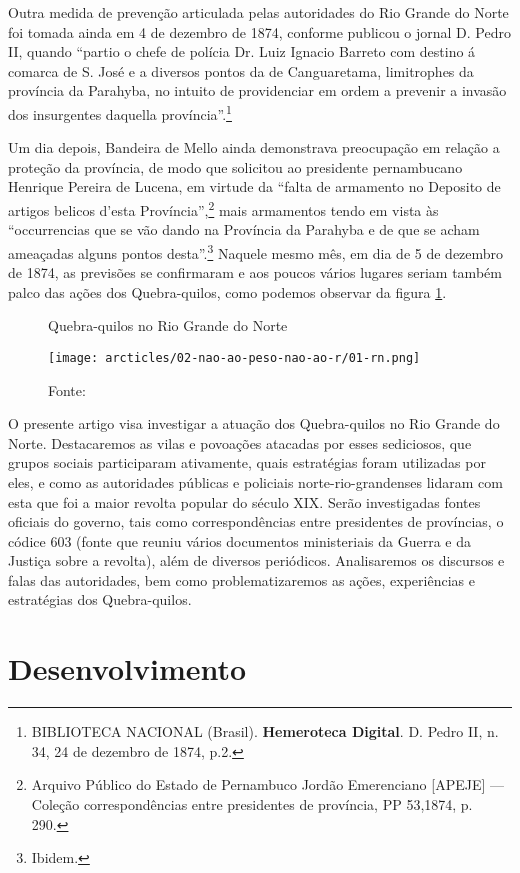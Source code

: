 \begin{refsection}
Outra medida de prevenção articulada pelas autoridades do Rio Grande do Norte foi tomada ainda em 4 de dezembro de 1874, conforme publicou o jornal D. Pedro II, quando “partio o chefe de polícia Dr. Luiz Ignacio Barreto com destino á comarca de S. José e a diversos pontos da de Canguaretama, limitrophes da província da Parahyba, no intuito de providenciar em ordem a prevenir a invasão dos insurgentes daquella província”.\footnote{BIBLIOTECA NACIONAL (Brasil). \textbf{Hemeroteca Digital}. D. Pedro II, n. 34, 24 de dezembro de 1874, p.2. }

Um dia depois, Bandeira de Mello ainda demonstrava preocupação em relação a proteção da província, de modo que solicitou ao presidente pernambucano Henrique Pereira de Lucena, em virtude da “falta de armamento no Deposito de artigos belicos d’esta Província”,\footnote{Arquivo Público do Estado de Pernambuco Jordão Emerenciano [APEJE] --- Coleção correspondências entre presidentes de província, PP 53,1874, p. 290.} mais armamentos tendo em vista às “occurrencias que se vão dando na Província da Parahyba e de que se acham ameaçadas alguns pontos desta”.\footnote{Ibidem.} Naquele mesmo mês, em dia de 5 de dezembro de 1874, as previsões se confirmaram e aos poucos vários lugares seriam também palco das ações dos Quebra-quilos, como podemos observar da figura \ref{fig:quebra-quilo-rn}. 

\begin{figure}[ht]%
    \centering%
    \caption{Quebra-quilos no Rio Grande do Norte}%
    \texttt{[image: arcticles/02-nao-ao-peso-nao-ao-r/01-rn.png]}%
    \caption*{Fonte: \textcite[p.~17]{Monteiro1993}}%
    \label{fig:quebra-quilo-rn}%
\end{figure}%

O presente artigo visa investigar a atuação dos Quebra-quilos no Rio Grande do Norte. Destacaremos as vilas e povoações atacadas por esses sediciosos, que grupos sociais participaram ativamente, quais estratégias foram utilizadas por eles, e como as autoridades públicas e policiais norte-rio-grandenses lidaram com esta que foi a maior revolta popular do século XIX. Serão investigadas fontes oficiais do governo, tais como correspondências entre presidentes de províncias, o códice 603 (fonte que reuniu vários documentos ministeriais da Guerra e da Justiça sobre a revolta), além de diversos periódicos. Analisaremos os discursos e falas das autoridades, bem como problematizaremos as ações, experiências e estratégias dos Quebra-quilos.

\section{Desenvolvimento}


\end{refsection}
